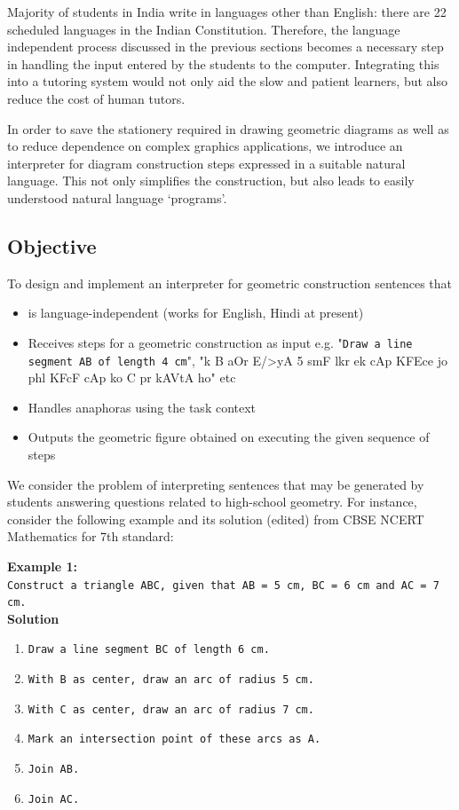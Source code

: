 \def\DevnagVersion{2.15}\documentclass[12pt]{article}
\begin{document}
Majority of students in India write in languages other than English: there are 22 scheduled languages in the Indian Constitution. Therefore, the language independent process discussed in the previous sections becomes a necessary step in handling the input entered by the students to the computer. Integrating this into a tutoring system would not only aid the slow and patient learners, but also reduce the cost of human tutors.

In order to save the stationery required in drawing geometric diagrams as well as to reduce dependence on complex graphics applications, we introduce an interpreter for diagram construction steps expressed in a suitable natural language. This not only simplifies the construction, but also leads to easily understood natural language `programs'.

\subsection{Objective}
To design and implement an interpreter for geometric construction sentences that
\begin{itemize}
	\item is language-independent (works for English, Hindi at present)
	\item Receives steps for a geometric construction as input e.g. "\texttt{Draw a line segment AB of length 4 cm}", "{\dn k\?{\qva}} B {\dn aOr E/>yA} 5 {\dn s\?mF l\?kr ek cAp KF{\qva}Ece jo phl\? KF{\qva}cF cAp ko} C {\dn pr kAVtA ho}" etc
  \item Handles anaphoras using the task context
	\item Outputs the geometric figure obtained on executing the given sequence of steps 
\end{itemize}

We consider the problem of interpreting sentences that may be generated by students answering questions related to high-school geometry. For instance, consider the following example and its solution (edited) from CBSE NCERT Mathematics for 7th standard:

\textbf{Example 1:}\\
\texttt{Construct a triangle ABC, given that AB = 5 cm, BC = 6 cm and AC = 7 cm.}\\
\textbf{Solution}
\begin{enumerate}
\item \texttt{Draw a line segment BC of length 6 cm.}
\item \texttt{With B as center, draw an arc of radius 5 cm.}
\item \texttt{With C as center, draw an arc of radius 7 cm.}
\item \texttt{Mark an intersection point of these arcs as A.}
\item \texttt{Join AB.}
\item \texttt{Join AC.}
\end{enumerate}
\end{document}
